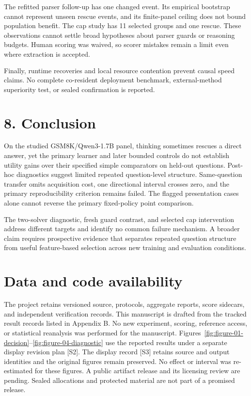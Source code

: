 \documentclass[11pt,a4paper]{article}
\begin{document}
The refitted parser follow-up has one changed event. Its empirical bootstrap cannot represent unseen rescue events, and its finite-panel ceiling does not bound population benefit. The cap study has 11 selected groups and one rescue. These observations cannot settle broad hypotheses about parser guards or reasoning budgets. Human scoring was waived, so scorer mistakes remain a limit even where extraction is accepted.

Finally, runtime recoveries and local resource contention prevent causal speed claims. No complete co-resident deployment benchmark, external-method superiority test, or sealed confirmation is reported.

\section*{8. Conclusion}\label{sec:8-conclusion}
On the studied GSM8K/Qwen3-1.7B panel, thinking sometimes rescues a direct answer, yet the primary learner and later bounded controls do not establish utility gains over their specified simple comparators on held-out questions. Post-hoc diagnostics suggest limited repeated question-level structure. Same-question transfer omits acquisition cost, one directional interval crosses zero, and the primary reproducibility criterion remains failed. The flagged presentation cases alone cannot reverse the primary fixed-policy point comparison.

The two-solver diagnostic, fresh guard contrast, and selected cap intervention address different targets and identify no common failure mechanism. A broader claim requires prospective evidence that separates repeated question structure from useful feature-based selection across new training and evaluation conditions.

\section*{Data and code availability}\label{sec:data-and-code-availability}
The project retains versioned source, protocols, aggregate reports, score sidecars, and independent verification records. This manuscript is drafted from the tracked result records listed in Appendix B. No new experiment, scoring, reference access, or statistical reanalysis was performed for the manuscript. Figures~\ref{fig:figure-01-decision}--\ref{fig:figure-04-diagnostic} use the reported results under a separate display revision plan [S2]. The display record [S3] retains source and output identities and the original figures remain preserved. No effect or interval was re-estimated for these figures. A public artifact release and its licensing review are pending. Sealed allocations and protected material are not part of a promised release.
\end{document}

